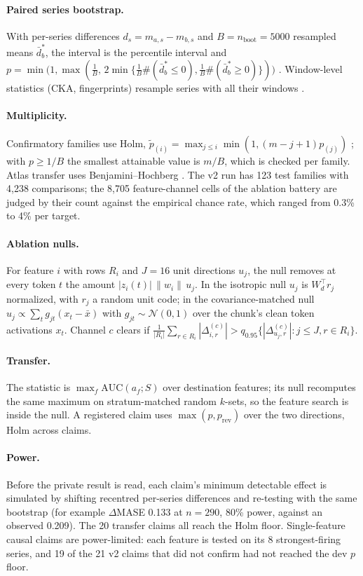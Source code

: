 \paragraph{Paired series bootstrap.} With per-series differences $d_s=m_{a,s}-m_{b,s}$ and $B=n_{\text{boot}}=5000$
resampled means $\bar d^*_b$, the interval is the percentile interval and
$p=\min\!\big(1,\max(\tfrac1B,\,2\min\{\tfrac1B\#(\bar d^*_b\le 0),\tfrac1B\#(\bar d^*_b\ge 0)\})\big)$
\citep{phipson2010permutation}. Window-level statistics (CKA, fingerprints) resample series with all their windows
\citep{cameron2008cluster}.

\paragraph{Multiplicity.} Confirmatory families use Holm, $\tilde p_{(i)}=\max_{j\le i}\min(1,(m-j+1)p_{(j)})$
\citep{holm1979}; with $p\ge 1/B$ the smallest attainable value is $m/B$, which is checked per family. Atlas transfer
uses Benjamini--Hochberg \citep{benjamini1995fdr}. The v2 run has 123 test families with 4{,}238 comparisons; the
8{,}705 feature-channel cells of the ablation battery are judged by their count against the empirical chance rate,
which ranged from 0.3\% to 4\% per target.

\paragraph{Ablation nulls.} For feature $i$ with rows $R_i$ and $J=16$ unit directions $u_j$, the null removes at every
token $t$ the amount $|z_i(t)|\,\|w_i\|\,u_j$. In the isotropic null $u_j$ is $W_d^{\top}r_j$ normalized, with $r_j$ a
random unit code; in the covariance-matched null $u_j\propto\sum_t g_{jt}(x_t-\bar x)$ with $g_{jt}\sim\mathcal{N}(0,1)$
over the chunk's clean token activations $x_t$. Channel $c$ clears if
$\frac{1}{|R_i|}\sum_{r\in R_i}|\Delta^{(c)}_{i,r}| > q_{0.95}\{|\Delta^{(c)}_{u_j,r}|: j\le J, r\in R_i\}$.

\paragraph{Transfer.} The statistic is $\max_f \mathrm{AUC}(a_f;S)$ over destination features; its null recomputes the
same maximum on stratum-matched random $k$-sets, so the feature search is inside the null. A registered claim uses
$\max(p,p_{\text{rev}})$ over the two directions, Holm across claims.

\paragraph{Power.} Before the private result is read, each claim's minimum detectable effect is simulated by shifting
recentred per-series differences and re-testing with the same bootstrap (for example $\Delta$MASE 0.133 at $n=290$, 80\%
power, against an observed 0.209). The 20 transfer claims all reach the Holm floor. Single-feature causal claims are
power-limited: each feature is tested on its 8 strongest-firing series, and 19 of the 21 v2 claims that did not confirm
had not reached the dev $p$ floor.

